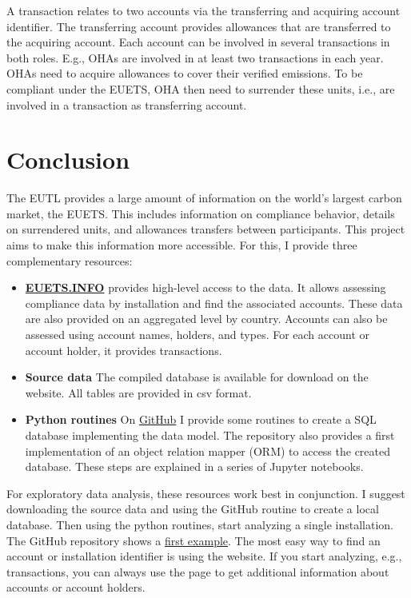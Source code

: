 \documentclass[authoryear]{elsarticle}
\begin{document}
A transaction relates to two accounts via the transferring and acquiring account identifier. The transferring account provides allowances that are transferred to the acquiring account. Each account can be involved in several transactions in both roles. E.g., OHAs are involved in at least two transactions in each year. OHAs need to acquire allowances to cover their verified emissions. To be compliant under the EUETS, OHA then need to surrender these units, i.e., are involved in a transaction as transferring account. 

\section{Conclusion}

The EUTL provides a large amount of information on the world's largest carbon market, the EUETS. This includes information on compliance behavior, details on surrendered units, and allowances transfers between participants. This project aims to make this information more accessible. For this, I provide three complementary resources:

\begin{itemize}
	\item \textbf{\href{https://euets.info}{EUETS.INFO}} provides high-level access to the data. It allows assessing compliance data by installation and find the associated accounts. These data are also provided on an aggregated level by country. Accounts can also be assessed using account names, holders, and types. For each account or account holder, it provides transactions.
	\item \textbf{Source data} The compiled database is available for download on the website. All tables are provided in csv format. 
	\item \textbf{Python routines} On \href{https://github.com/jabrell/eutl_orm}{GitHub} I provide some routines to create a SQL database implementing the data model. The repository also provides a first implementation of an object relation mapper (ORM) to access the created database. These steps are explained in a series of Jupyter notebooks. 
\end{itemize}

For exploratory data analysis, these resources work best in conjunction. I suggest downloading the source data and using the GitHub routine to create a local database. Then using the python routines, start analyzing a single installation. The GitHub repository shows a \href{https://github.com/jabrell/eutl_orm/blob/main/2_Installations.ipynb}{first example}. The most easy way to find an account or installation identifier is using the website. If you start analyzing, e.g., transactions, you can always use the page to get additional information about accounts or account holders. 
\end{document}
